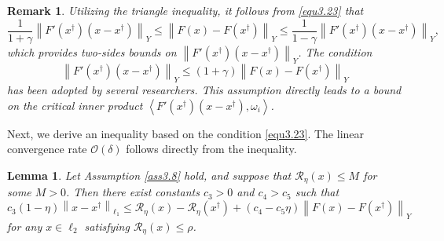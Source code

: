 \documentclass[a4paper,12pt]{article}
\newtheorem{lemma}[theorem]{Lemma}
\newtheorem{remark}[theorem]{Remark}
\numberwithin{equation}{section}
\begin{document}
\begin{remark}\label{rem3.9}
    Utilizing the triangle inequality, it follows from \eqref{equ3.23} that
    \begin{equation}\label{equ3.24}
        \frac{1}{1+\gamma}\left\|F'\left(x^{\dagger}\right) \left(x-x^{\dagger}\right)\right\|_{Y}\leq \left\|F\left(x\right)-F\left(x^{\dagger}\right)\right\|_{Y}\leq \frac{1}{1-\gamma}\left\|F'\left(x^{\dagger}\right) \left(x-x^{\dagger}\right)\right\|_{Y},
    \end{equation}
    which provides two-sides bounds on $\left\|F'\left(x^{\dagger}\right) \left(x-x^{\dagger}\right)\right\|_{Y}$. The condition
    \begin{equation*}
        \left\|F'\left(x^{\dagger}\right) \left(x-x^{\dagger}\right)\right\|_{Y}\leq \left(1+\gamma\right)\left\|F\left(x\right)-F\left(x^{\dagger}\right)\right\|_{Y}
    \end{equation*}
    has been adopted by several researchers. This assumption directly leads to a bound on the critical inner product $\left<F'\left(x^{\dagger}\right) \left(x-x^{\dagger}\right),\omega_{i}\right>$.
\end{remark}

\par Next, we derive an inequality based on the condition \eqref{equ3.23}. The linear convergence rate $\mathcal{O}\left(\delta\right)$ follows directly from the inequality.

\begin{lemma}\label{lem3.10}
    Let Assumption \ref{ass3.8} hold, and suppose that $\mathcal{R}_{\eta}\left(x\right)\leq M$ for some $M>0$. Then there exist constants $c_{3}>0$ and $c_{4}>c_{5}$ such that
    \begin{equation}\label{equ3.25}
        c_{3}\left(1-\eta\right)\left\|x-x^{\dagger}\right\|_{\ell_{1}}\leq \mathcal{R}_{\eta}\left(x\right)-\mathcal{R}_{\eta}\left(x^{\dagger}\right)+ \left(c_{4}-c_{5}\eta\right)\left\|F\left(x\right)- F\left(x^{\dagger}\right)\right\|_{Y}
    \end{equation}
    for any $x\in\ell_{2}$ satisfying $\mathcal{R}_{\eta}\left(x\right)\leq\rho$.
\end{lemma}
\end{document}
